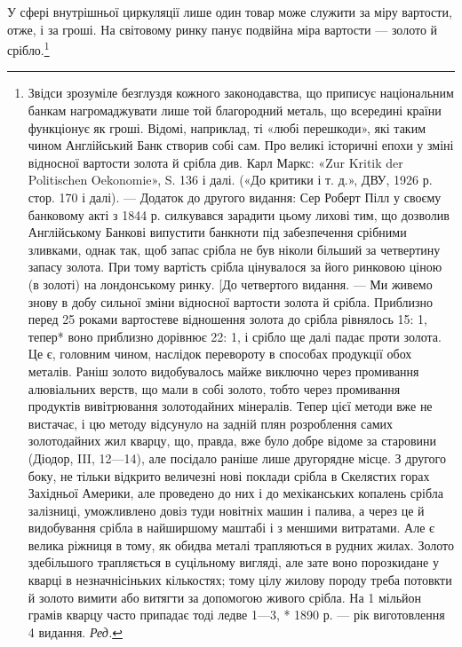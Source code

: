 У сфері внутрішньої циркуляції лише один товар може служити
за міру вартости, отже, і за гроші. На світовому ринку
панує подвійна міра вартости — золото й срібло.\footnote{
Звідси зрозуміле безглуздя кожного законодавства, що приписує
національним банкам нагромаджувати лише той благородний металь,
що всередині країни функціонує як гроші. Відомі, наприклад, ті «любі
перешкоди», які таким чином Англійський Банк створив собі сам. Про
великі історичні епохи у зміні відносної вартости золота й срібла див.
Карл Маркс: «Zur Kritik der Politischen Oekonomie», S. 136 і далі. («До
критики і т. д.», ДВУ, 1926 р. стор. 170 і далі). — Додаток до другого видання:
Сер Роберт Пілл у своєму банковому акті з 1844 р. силкувався зарадити
цьому лихові тим, що дозволив Англійському Банкові випустити банкноти
під забезпечення срібними зливками, однак так, щоб запас срібла
не був ніколи більший за четвертину запасу золота. При тому вартість
срібла цінувалося за його ринковою ціною (в золоті) на лондонському
ринку. [До четвертого видання. — Ми живемо знову в добу сильної зміни
відносної вартости золота й срібла. Приблизно перед 25 роками вартостеве
відношення золота до срібла рівнялось 15: 1, тепер* воно приблизно
дорівнює 22: 1, і срібло ще далі падає проти золота. Це є, головним чином,
наслідок перевороту в способах продукції обох металів. Раніш золото
видобувалось майже виключно через промивання алювіальних
верств, що мали в собі золото, тобто через промивання продуктів вивітрювання
золотодайних мінералів. Тепер цієї методи вже не вистачає,
і цю методу відсунуло на задній плян розроблення самих золотодайних
жил кварцу, що, правда, вже було добре відоме за старовини (Діодор, III,
12—14), але посідало раніше лише другорядне місце. З другого боку, не
тільки відкрито величезні нові поклади срібла в Скелястих горах Західньої
Америки, але проведено до них і до мехіканських копалень срібла
залізниці, уможливлено довіз туди новітніх машин і палива, а через це
й видобування срібла в найширшому маштабі і з меншими витратами.
Але є велика ріжниця в тому, як обидва металі трапляються в рудних
жилах. Золото здебільшого трапляється в суцільному вигляді, але зате воно
порозкидане у кварці в незначнісіньких кількостях; тому цілу жилову
породу треба потовкти й золото вимити або витягти за допомогою живого
срібла. На 1 мільйон грамів кварцу часто припадає тоді ледве 1—3,
* 1890 р. — рік виготовлення 4 видання. \emph{Ред.}
}

